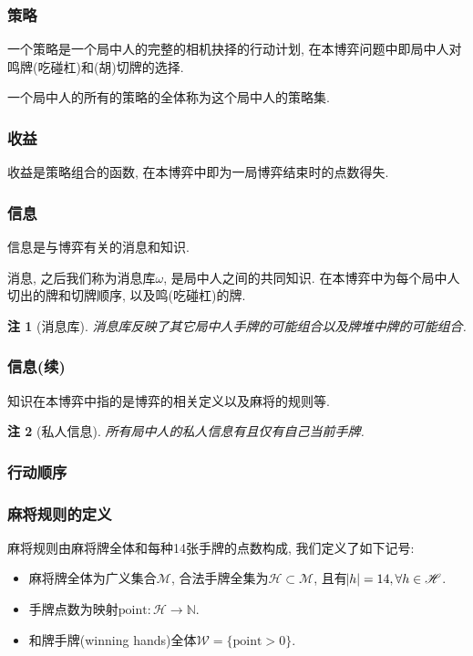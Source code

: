 \documentclass[xcolor=dvipsnames]{ctexbeamer}
\newtheorem{note}{注}[section]
\newcommand{\mahjong}{\mathscr{M}}
\newcommand{\point}{\mathrm{point}}
\newcommand{\Hand}{\mathscr{H}}
\newcommand{\hand}{h}
\newcommand{\base}{\omega}
\begin{document}
	\begin{frame}
		\frametitle{策略}
		\begin{definition}[策略]
			一个策略是一个局中人的完整的相机抉择的行动计划,
			在本博弈问题中即局中人对鸣牌(吃碰杠)和(胡)切牌的选择.
		\end{definition}
		\begin{definition}[策略集]
			一个局中人的所有的策略的全体称为这个局中人的策略集.
		\end{definition}
	\end{frame}

	\begin{frame}
		\frametitle{收益}
		\begin{definition}[收益]
			收益是策略组合的函数, 在本博弈中即为一局博弈结束时的点数得失.
		\end{definition}
	\end{frame}

	\begin{frame}
		\frametitle{信息}
		\begin{definition}[信息]
			信息是与博弈有关的消息和知识.
		\end{definition}
		\begin{definition}[消息]
			消息, 之后我们称为消息库$\base$, 是局中人之间的共同知识.
			在本博弈中为每个局中人切出的牌和切牌顺序, 以及鸣(吃碰杠)的牌.
		\end{definition}
		\begin{note}[消息库]
			消息库反映了其它局中人手牌的可能组合以及牌堆中牌的可能组合.
		\end{note}
	\end{frame}

	\begin{frame}
		\frametitle{信息(续)}
		\begin{definition}[知识]
			知识在本博弈中指的是博弈的相关定义以及麻将的规则等.
		\end{definition}
		\begin{note}[私人信息]
			所有局中人的私人信息有且仅有自己当前手牌.
		\end{note}
	\end{frame}
	
	\begin{frame}
		\frametitle{行动顺序}

	\end{frame}

	\begin{frame}
		\frametitle{麻将规则的定义}
		\begin{definition}[麻将规则]
			麻将规则由麻将牌全体和每种14张手牌的点数构成, 我们定义了如下记号:
			\begin{itemize}
				\item 麻将牌全体为广义集合$\mahjong$,
					合法手牌全集为$\Hand\subset\mahjong$,
					且有$\abs{\hand}=14, \forall{\hand\in\Hand}$.
				\item 手牌点数为映射$\point: \Hand\rightarrow\mathbb{N}$.
				\item 和牌手牌(winning hands)全体$\mathscr{W}=\{\point>0\}$.
			\end{itemize}
		\end{definition}
	\end{frame}
\end{document}
